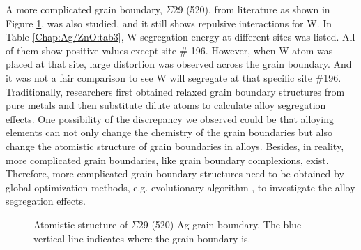 A more complicated grain boundary, $\Sigma$29 (520), from literature \cite{zhu2018predicting} as shown in Figure \ref{Chap:Ag/ZnO:fig20}, was also studied, and it still shows repulsive interactions for W. In Table \ref{Chap:Ag/ZnO:tab3}, W segregation energy at different sites was listed. All of them show positive values except site \# 196. However, when W atom was placed at that site, large distortion was observed across the grain boundary. And it was not a fair comparison to see W will segregate at that specific site \#196.  Traditionally, researchers first obtained relaxed grain boundary structures from pure metals and then substitute dilute atoms to calculate alloy segregation effects. One possibility of the discrepancy we observed could be that alloying elements can not only change the chemistry of the grain boundaries but also change the atomistic structure of grain boundaries in alloys. Besides, in reality, more complicated grain boundaries, like grain boundary complexions, exist\cite{cantwell2014grain}. Therefore, more complicated grain boundary structures need to be obtained by global optimization methods, e.g. evolutionary algorithm \cite{yang2020grain}, to investigate the alloy segregation effects.


\begingroup
\begin{figure}[!ht]
  \centering
  \caption[Atomistic structure of $\Sigma$29 (520) Ag grain boundary.]{Atomistic structure of $\Sigma$29 (520) Ag grain boundary. The blue vertical line indicates where the grain boundary is.}
  \label{Chap:Ag/ZnO:fig20}
\end{figure}
\endgroup

